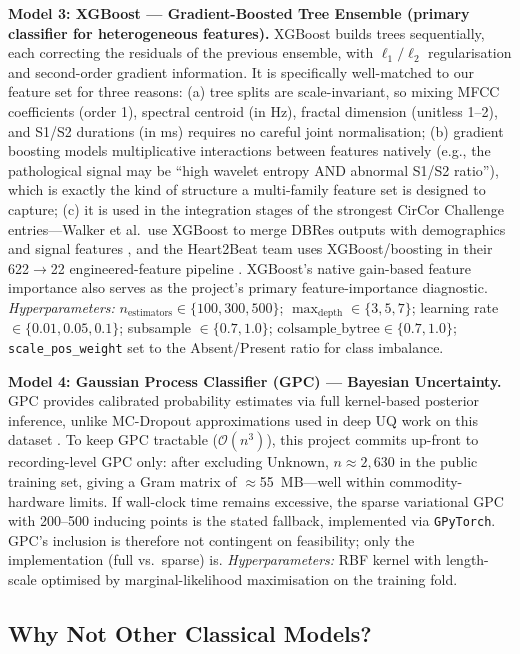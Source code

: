 \documentclass[10pt,twocolumn]{article}
\begin{document}
\textbf{Model 3: XGBoost --- Gradient-Boosted Tree Ensemble (primary classifier for heterogeneous features).} XGBoost builds trees sequentially, each correcting the residuals of the previous ensemble, with $\ell_1/\ell_2$ regularisation and second-order gradient information. It is specifically well-matched to our feature set for three reasons: (a) tree splits are scale-invariant, so mixing MFCC coefficients (order 1), spectral centroid (in Hz), fractal dimension (unitless 1--2), and S1/S2 durations (in ms) requires no careful joint normalisation; (b) gradient boosting models multiplicative interactions between features natively (e.g., the pathological signal may be ``high wavelet entropy AND abnormal S1/S2 ratio''), which is exactly the kind of structure a multi-family feature set is designed to capture; (c) it is used in the integration stages of the strongest CirCor Challenge entries---Walker et al.\ use XGBoost to merge DBRes outputs with demographics and signal features \citep{walker2022dbres}, and the Heart2Beat team uses XGBoost/boosting in their 622$\rightarrow$22 engineered-feature pipeline \citep{rohr2024heart2beat}. XGBoost's native gain-based feature importance also serves as the project's primary feature-importance diagnostic.
\textit{Hyperparameters:} $n_{\text{estimators}} \in \{100, 300, 500\}$; $\max_{\text{depth}} \in \{3, 5, 7\}$; learning rate $\in \{0.01, 0.05, 0.1\}$; subsample $\in \{0.7, 1.0\}$; $\text{colsample\_bytree} \in \{0.7, 1.0\}$; \texttt{scale\_pos\_weight} set to the Absent/Present ratio for class imbalance.

\textbf{Model 4: Gaussian Process Classifier (GPC) --- Bayesian Uncertainty.} GPC provides calibrated probability estimates via full kernel-based posterior inference, unlike MC-Dropout approximations used in deep UQ work on this dataset \citep{walker2022dbres}. To keep GPC tractable ($\mathcal{O}(n^3)$), this project commits up-front to recording-level GPC only: after excluding Unknown, $n \approx 2{,}630$ in the public training set, giving a Gram matrix of $\approx$55~MB---well within commodity-hardware limits. If wall-clock time remains excessive, the sparse variational GPC with 200--500 inducing points \citep{rasmussen2006} is the stated fallback, implemented via \texttt{GPyTorch}. GPC's inclusion is therefore not contingent on feasibility; only the implementation (full vs.\ sparse) is.
\textit{Hyperparameters:} RBF kernel with length-scale optimised by marginal-likelihood maximisation on the training fold.

\subsection{Why Not Other Classical Models?}
\end{document}
